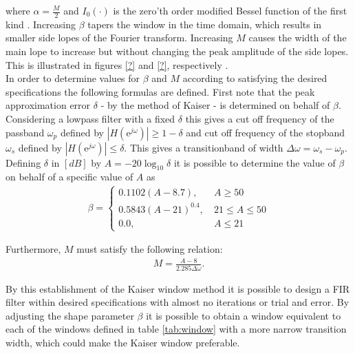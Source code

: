where $\alpha=\frac{M}{2}$ and $I_0(\cdot)$ is the zero'th order modified Bessel function of the first kind \cite{DTSP, p.474-476}. Increasing $\beta$ tapers the window in the time domain, which results in smaller side lopes of the Fourier transform. Increasing $M$ causes the width of the main lope to increase but without changing the peak amplitude of the side lopes. This is illustrated in figures \ref{?} and \ref{?}, respectively .\\ 
In order to determine values for $\beta$ and $M$ according to  satisfying the desired specifications the following formulas are defined. First note that the peak approximation error $\delta$ - by the method of Kaiser - is determined on behalf of $\beta$. Considering a lowpass filter with a fixed $\delta$ this gives a cut off frequency of the passband $\omega_p$ defined by $|H(\text{e}^{j\omega})| \geq 1-\delta$ and cut off frequency of the stopband $\omega_s$ defined by $|H(\text{e}^{j\omega})| \leq \delta$. This gives a transitionband of width $\Delta \omega = \omega_s - \omega_p$. Defining $\delta$ in $[dB]$ by $A=-20\log_{10} \delta$ it is possible to determine the value of $\beta$ on behalf of a specific value of $A$ as 
\begin{align}
\beta =
\left\{ \begin{matrix}
0.1102\left( A-8.7 \right), &\ A \geq 50 \\
0.5843\left(A-21\right)^{0.4}, &\ 21 \leq A \leq 50 \\
0.0, &\  A \leq 21 
\end{matrix}\right.
\end{align}
       
Furthermore, $M$ must satisfy the following relation:
\begin{align}
M=\frac{A-8}{2.285\Delta \omega}.
\end{align}

By this establishment of the Kaiser window method it is possible to design a FIR filter within desired specifications with almost no iterations or trial and error. By adjusting the shape parameter $\beta$ it is possible to obtain a window equivalent to each of the windows defined in table \ref{tab:window} with a more narrow transition width, which could make the Kaiser window preferable.    


